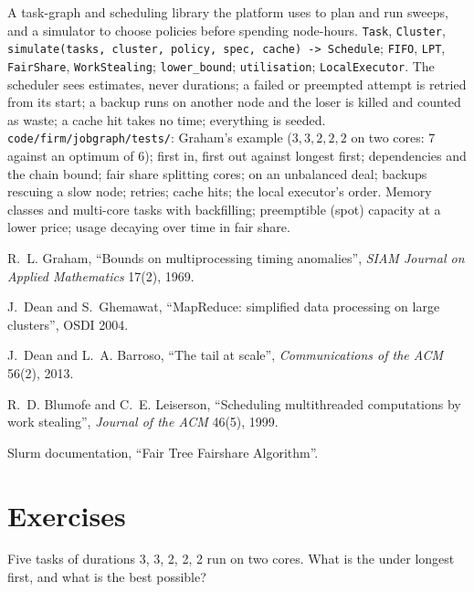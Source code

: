 \begin{build}
 A task-graph and scheduling library the platform uses to plan and run sweeps, and a simulator to choose policies before
spending node-hours.
 \texttt{Task}, \texttt{Cluster}, \texttt{simulate(tasks, cluster, policy, spec, cache) -> Schedule};
\texttt{FIFO}, \texttt{LPT}, \texttt{FairShare}, \texttt{WorkStealing}; \texttt{lower\_bound}; \texttt{utilisation};
\texttt{LocalExecutor}.
 The scheduler sees estimates, never durations; a failed or preempted attempt is retried from its start; a backup runs on
another node and the loser is killed and counted as waste; a cache hit takes no time; everything is seeded.
 \texttt{code/firm/jobgraph/tests/}: Graham's example ($3,3,2,2,2$ on two cores: 7 against an optimum of 6); first
in, first out against longest first; dependencies and the chain bound; fair share splitting cores;  on an unbalanced deal;
backups rescuing a slow node; retries; cache hits; the local executor's order.
 Memory classes and multi-core tasks with backfilling; preemptible (spot) capacity at a lower price; usage decaying over time in
fair share.
\end{build}

\begin{omsources}
\item R.~L. Graham, ``Bounds on multiprocessing timing anomalies'', \emph{SIAM Journal on Applied Mathematics} 17(2), 1969.
\item J.~Dean and S.~Ghemawat, ``MapReduce: simplified data processing on large clusters'', OSDI 2004.
\item J.~Dean and L.~A. Barroso, ``The tail at scale'', \emph{Communications of the ACM} 56(2), 2013.
\item R.~D. Blumofe and C.~E. Leiserson, ``Scheduling multithreaded computations by work stealing'', \emph{Journal of the ACM} 46(5), 1999.
\item Slurm documentation, ``Fair Tree Fairshare Algorithm''.
\end{omsources}

\section{Exercises}

\begin{exercise}[$\star$]\label{exo:pl:distributed-compute-and-schedulers:1}
Five tasks of durations 3, 3, 2, 2, 2 run on two cores. What is the  under longest first, and what is the best possible?
\end{exercise}


